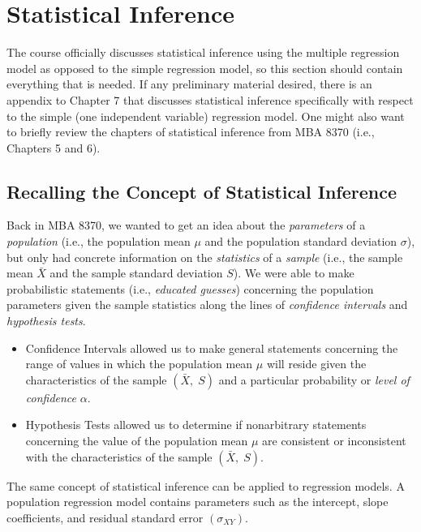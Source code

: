 \documentclass[
]{book}
\begin{document}
\hypertarget{statistical-inference}{%
\section{Statistical Inference}\label{statistical-inference}}

The course officially discusses statistical inference using the multiple regression model as opposed to the simple regression model, so this section should contain everything that is needed. If any preliminary material desired, there is an appendix to Chapter 7 that discusses statistical inference specifically with respect to the simple (one independent variable) regression model. One might also want to briefly review the chapters of statistical inference from MBA 8370 (i.e., Chapters 5 and 6).

\hypertarget{recalling-the-concept-of-statistical-inference}{%
\subsection{Recalling the Concept of Statistical Inference}\label{recalling-the-concept-of-statistical-inference}}

Back in MBA 8370, we wanted to get an idea about the \emph{parameters} of a \emph{population} (i.e., the population mean \(\mu\) and the population standard deviation \(\sigma\)), but only had concrete information on the \emph{statistics} of a \emph{sample} (i.e., the sample mean \(\bar{X}\) and the sample standard deviation \(S\)). We were able to make probabilistic statements (i.e., \emph{educated guesses}) concerning the population parameters given the sample statistics along the lines of \emph{confidence intervals} and \emph{hypothesis tests}.

\begin{itemize}
\item
  Confidence Intervals allowed us to make general statements concerning the range of values in which the population mean \(\mu\) will reside given the characteristics of the sample \((\bar{X},\;S)\) and a particular probability or \emph{level of confidence} \(\alpha\).
\item
  Hypothesis Tests allowed us to determine if nonarbitrary statements concerning the value of the population mean \(\mu\) are consistent or inconsistent with the characteristics of the sample \((\bar{X},\;S)\).
\end{itemize}

The same concept of statistical inference can be applied to regression models. A population regression model contains parameters such as the intercept, slope coefficients, and residual standard error \((\sigma_{XY})\).
\end{document}
